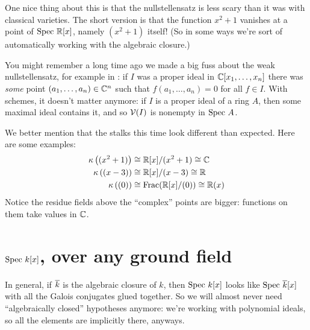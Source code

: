 One nice thing about this is that the nullstellensatz
is less scary than it was with classical varieties.
The short version is that the function $x^2+1$
vanishes at a point of $\text{Spec } \mathbb R[x]$, namely $(x^2+1)$ itself!
(So in some ways we're sort of automatically working
with the algebraic closure.)

You might remember a long time ago we made a big fuss about
the weak nullstellensatz, for example in
:
if $I$ was a proper ideal in $\mathbb C[x_1, \dots, x_n]$
there was \emph{some} point $(a_1, \dots, a_n) \in \mathbb C^n$
such that $f(a_1, \dots, a_n) = 0$ for all $f \in I$.
With schemes, it doesn't matter anymore:
if $I$ is a proper ideal of a ring $A$,
then some maximal ideal contains it,
and so $\mathcal V(I)$ is nonempty in $\text{Spec } A$.

We better mention that the stalks this time look different than expected.
Here are some examples:
\begin{align*}
	\kappa\left( (x^2+1) \right) &\cong \mathbb R[x]/(x^2+1) \cong \mathbb C \\
	\kappa \left( (x-3) \right) &\cong \mathbb R[x] / (x-3) \cong \mathbb R \\
	\kappa \left( (0) \right) &\cong \operatorname{Frac}(\mathbb R[x] / (0)) \cong \mathbb R(x)
\end{align*}
Notice the residue fields above the ``complex''
points are bigger: functions on them take values in $\mathbb C$.


\section{$\text{Spec } k[x]$, over any ground field}
In general, if $\overline k$ is the algebraic closure of $k$,
then $\text{Spec } k[x]$ looks like $\text{Spec } \overline k[x]$
with all the Galois conjugates glued together.
So we will almost never need ``algebraically closed''
hypotheses anymore: we're working with polynomial ideals,
so all the elements are implicitly there, anyways.

